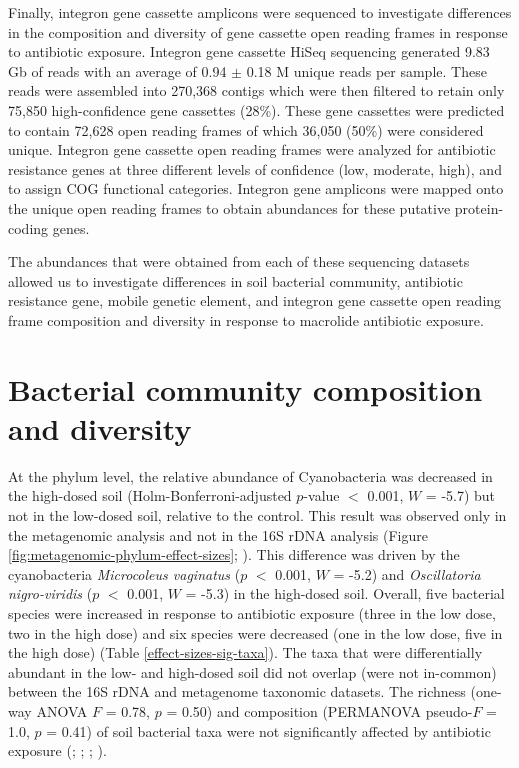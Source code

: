 Finally, integron gene cassette amplicons were sequenced to investigate differences in the composition and diversity of gene cassette open reading frames in response to antibiotic exposure.
Integron gene cassette HiSeq sequencing generated 9.83 Gb of reads with an average of 0.94 $\pm$ 0.18 M unique reads per sample.
These reads were assembled into 270,368 contigs which were then filtered to retain only 75,850 high-confidence gene cassettes (28\%).
These gene cassettes were predicted to contain 72,628 open reading frames of which 36,050 (50\%) were considered unique.
Integron gene cassette open reading frames were analyzed for antibiotic resistance genes at three different levels of confidence (low, moderate, high), and to assign COG functional categories.
Integron gene amplicons were mapped onto the unique open reading frames to obtain abundances for these putative protein-coding genes.

The abundances that were obtained from each of these sequencing datasets allowed us to investigate differences in soil bacterial community, antibiotic resistance gene, mobile genetic element, and integron gene cassette open reading frame composition and diversity in response to macrolide antibiotic exposure.

\section{Bacterial community composition and diversity}

At the phylum level, the relative abundance of Cyanobacteria was decreased in the high-dosed soil (Holm-Bonferroni-adjusted $p$-value $<$ 0.001, $W$ = -5.7) but not in the low-dosed soil, relative to the control.
This result was observed only in the metagenomic analysis and not in the 16S rDNA analysis (Figure \ref{fig:metagenomic-phylum-effect-sizes}; \dummyfig).
This difference was driven by the cyanobacteria \textit{Microcoleus vaginatus} ($p$ $<$ 0.001, $W$ = -5.2) and \textit{Oscillatoria nigro-viridis} ($p$ $<$ 0.001, $W$ = -5.3) in the high-dosed soil.
Overall, five bacterial species were increased in response to antibiotic exposure (three in the low dose, two in the high dose) and six species were decreased (one in the low dose, five in the high dose) (Table \ref{effect-sizes-sig-taxa}).
The taxa that were differentially abundant in the low- and high-dosed soil did not overlap (were not in-common) between the 16S rDNA and metagenome taxonomic datasets.
The richness (one-way ANOVA $F$ = 0.78, $p$ = 0.50) and composition (PERMANOVA pseudo-$F$ = 1.0, $p$ = 0.41) of soil bacterial taxa were not significantly affected by antibiotic exposure (\dummyfig; \dummyfig; \dummyfig; \dummyfig).

